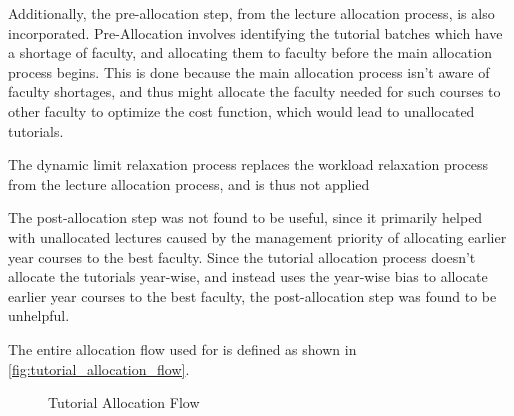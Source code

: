 Additionally, the pre-allocation step, from the lecture allocation process, is also incorporated. Pre-Allocation involves identifying the tutorial batches which have a shortage of faculty, and allocating them to faculty before the main allocation process begins. This is done because the main allocation process isn't aware of faculty shortages, and thus might allocate the faculty needed for such courses to other faculty to optimize the cost function, which would lead to unallocated tutorials.

The dynamic limit relaxation process replaces the workload relaxation process from the lecture allocation process, and is thus not applied

The post-allocation step was not found to be useful, since it primarily helped with unallocated lectures caused by the management priority of allocating earlier year courses to the best faculty. Since the tutorial allocation process doesn't allocate the tutorials year-wise, and instead uses the year-wise bias to allocate earlier year courses to the best faculty, the post-allocation step was found to be unhelpful.

The entire allocation flow used for is defined as shown in \autoref{fig:tutorial_allocation_flow}.

\begin{figure}[H]
  \centering
  \caption{Tutorial Allocation Flow}
  \label{fig:tutorial_allocation_flow}
\end{figure}

